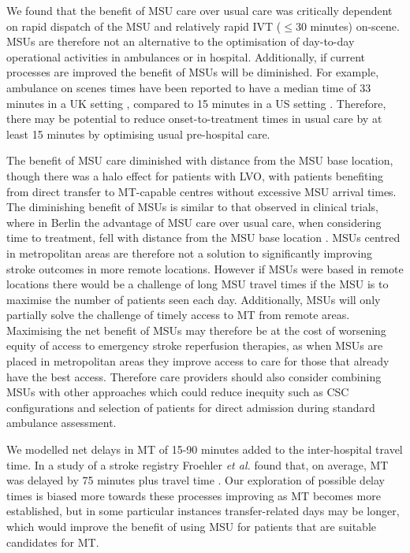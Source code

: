 We found that the benefit of MSU care over usual care was critically dependent on rapid dispatch of the MSU and relatively rapid IVT ($\leq$30 minutes) on-scene. MSUs are therefore not an alternative to the optimisation of day-to-day operational activities in ambulances or in hospital. Additionally, if current processes are improved the benefit of MSUs will be diminished. For example, ambulance on scenes times have been reported to have a median time of 33 minutes in a UK setting \cite{mcclelland_what_2023}, compared to 15 minutes in a US setting \cite{patel_evaluation_2014}. Therefore, there may be potential to reduce onset-to-treatment times in usual care by at least 15 minutes by optimising usual pre-hospital care.

The benefit of MSU care diminished with distance from the MSU base location, though there was a halo effect for patients with LVO, with patients benefiting from direct transfer to MT-capable centres without excessive MSU arrival times. The diminishing benefit of MSUs is similar to that observed in clinical trials, where in Berlin the advantage of MSU care over usual care, when considering time to treatment, fell with distance from the MSU base location \cite{koch_influence_2016}. MSUs centred in metropolitan areas are therefore not a solution to significantly improving stroke outcomes in more remote locations. However if MSUs were based in remote locations there would be a challenge of long MSU travel times if the MSU is to maximise the number of patients seen each day. Additionally, MSUs will only partially solve the challenge of timely access to MT from remote areas. Maximising the net benefit of MSUs may therefore be at the cost of worsening equity of access to emergency stroke reperfusion therapies, as when MSUs are placed in metropolitan areas they improve access to care for those that already have the best access. Therefore care providers should also consider combining MSUs with other approaches which could reduce inequity such as CSC configurations and selection of patients for direct admission during standard ambulance assessment. 

We modelled net delays in MT of 15-90 minutes added to the inter-hospital travel time. In a study of a stroke registry Froehler \textit{et al.} found that, on average, MT was delayed by 75 minutes plus travel time \cite{ froehler_interhospital_2017}. Our exploration of possible delay times is biased more towards these processes improving as MT becomes more established, but in some particular instances transfer-related days may be longer, which would improve the benefit of using MSU for patients that are suitable candidates for MT.

